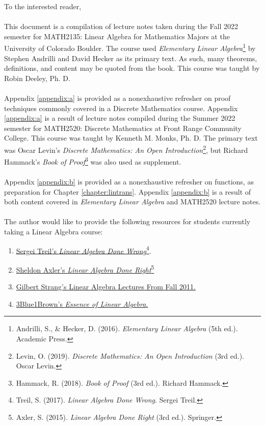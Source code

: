To the interested reader,
\\
\\
This document is a compilation of lecture notes taken during the Fall 2022 semester for MATH2135: Linear Algebra for Mathematics Majors at the University of Colorado Boulder. The course used \textit{Elementary Linear Algebra}\footnote{Andrilli, S., \& Hecker, D. (2016). \textit{Elementary Linear Algebra} (5th ed.). Academic Press.} by Stephen Andrilli and David Hecker as its primary text. As such, many theorems, definitions, and content may be quoted from the book. This course was taught by Robin Deeley, Ph. D.
\\
\\
Appendix \ref{appendix:a} is provided as a nonexhaustive refresher on proof techniques commonly covered in a Discrete Mathematics course. Appendix \ref{appendix:a} is a result of lecture notes compiled during the Summer 2022 semester for MATH2520: Discrete Mathematics at Front Range Community College. This course was taught by Kenneth M. Monks, Ph. D. The primary text was Oscar Levin's \textit{Discrete Mathematics: An Open Introduction}\footnote{Levin, O. (2019). \textit{Discrete Mathematics: An Open Introduction} (3rd ed.). Oscar Levin.}, but Richard Hammack's \textit{Book of Proof}\footnote{Hammack, R. (2018). \textit{Book of Proof} (3rd ed.). Richard Hammack.} was also used as supplement.
\\
\\
Appendix \ref{appendix:b} is provided as a nonexhaustive refresher on functions, as preparation for Chapter \ref{chapter:lintrans}. Appendix \ref{appendix:b} is a result of both content covered in \textit{Elementary Linear Algebra} and MATH2520 lecture notes.
\\
\\
The author would like to provide the following resources for students currently taking a Linear Algebra course:
\begin{enumerate}
    \item \href{https://www.math.brown.edu/streil/papers/LADW/LADW_2017-09-04.pdf}{Sergei Treil's \textit{Linear Algebra Done Wrong}}\footnote{Treil, S. (2017). \textit{Linear Algebra Done Wrong}. Sergei Treil.}.
    \item \href{https://link.springer.com/book/10.1007/978-3-319-11080-6?utm_medium=affiliate&utm_source=commission_junction_authors&utm_campaign=CONR_BOOKS_ECOM_GL_PHSS_ALWYS_DEEPLINK&utm_content=deeplink&utm_term=PID100197440&CJEVENT=f9f74b076a4c11ed80fe023d0a1c0e0d}{Sheldon Axler's \textit{Linear Algebra Done Right}}\footnote{Axler, S. (2015). \textit{Linear Algebra Done Right} (3rd ed.). Springer. }
    \item \href{https://youtube.com/playlist?list=PL221E2BBF13BECF6C}{Gilbert Strang's Linear Algebra Lectures From Fall 2011.}
    \item \href{https://www.youtube.com/playlist?app=desktop&list=PLZHQObOWTQDPD3MizzM2xVFitgF8hE_ab}{3Blue1Brown's \textit{Essence of Linear Algebra}.}
\end{enumerate}
